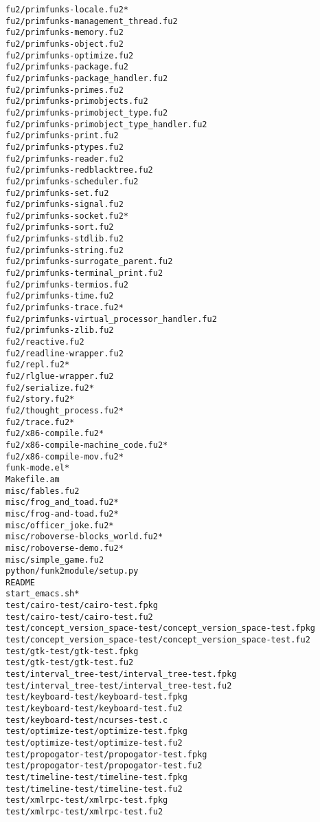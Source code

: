 \begin{lstlisting}
fu2/primfunks-locale.fu2*
fu2/primfunks-management_thread.fu2
fu2/primfunks-memory.fu2
fu2/primfunks-object.fu2
fu2/primfunks-optimize.fu2
fu2/primfunks-package.fu2
fu2/primfunks-package_handler.fu2
fu2/primfunks-primes.fu2
fu2/primfunks-primobjects.fu2
fu2/primfunks-primobject_type.fu2
fu2/primfunks-primobject_type_handler.fu2
fu2/primfunks-print.fu2
fu2/primfunks-ptypes.fu2
fu2/primfunks-reader.fu2
fu2/primfunks-redblacktree.fu2
fu2/primfunks-scheduler.fu2
fu2/primfunks-set.fu2
fu2/primfunks-signal.fu2
fu2/primfunks-socket.fu2*
fu2/primfunks-sort.fu2
fu2/primfunks-stdlib.fu2
fu2/primfunks-string.fu2
fu2/primfunks-surrogate_parent.fu2
fu2/primfunks-terminal_print.fu2
fu2/primfunks-termios.fu2
fu2/primfunks-time.fu2
fu2/primfunks-trace.fu2*
fu2/primfunks-virtual_processor_handler.fu2
fu2/primfunks-zlib.fu2
fu2/reactive.fu2
fu2/readline-wrapper.fu2
fu2/repl.fu2*
fu2/rlglue-wrapper.fu2
fu2/serialize.fu2*
fu2/story.fu2*
fu2/thought_process.fu2*
fu2/trace.fu2*
fu2/x86-compile.fu2*
fu2/x86-compile-machine_code.fu2*
fu2/x86-compile-mov.fu2*
funk-mode.el*
Makefile.am
misc/fables.fu2
misc/frog_and_toad.fu2*
misc/frog-and-toad.fu2*
misc/officer_joke.fu2*
misc/roboverse-blocks_world.fu2*
misc/roboverse-demo.fu2*
misc/simple_game.fu2
python/funk2module/setup.py
README
start_emacs.sh*
test/cairo-test/cairo-test.fpkg
test/cairo-test/cairo-test.fu2
test/concept_version_space-test/concept_version_space-test.fpkg
test/concept_version_space-test/concept_version_space-test.fu2
test/gtk-test/gtk-test.fpkg
test/gtk-test/gtk-test.fu2
test/interval_tree-test/interval_tree-test.fpkg
test/interval_tree-test/interval_tree-test.fu2
test/keyboard-test/keyboard-test.fpkg
test/keyboard-test/keyboard-test.fu2
test/keyboard-test/ncurses-test.c
test/optimize-test/optimize-test.fpkg
test/optimize-test/optimize-test.fu2
test/propogator-test/propogator-test.fpkg
test/propogator-test/propogator-test.fu2
test/timeline-test/timeline-test.fpkg
test/timeline-test/timeline-test.fu2
test/xmlrpc-test/xmlrpc-test.fpkg
test/xmlrpc-test/xmlrpc-test.fu2
\end{lstlisting}
